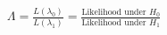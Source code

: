 \documentclass[preview]{standalone}
\begin{document}
\begin{align*}
\Lambda = \frac{L(\lambda_0)}{L(\lambda_1)} = \frac{\text{Likelihood under } H_0}{\text{Likelihood under } H_1}
\end{align*}
\end{document}

